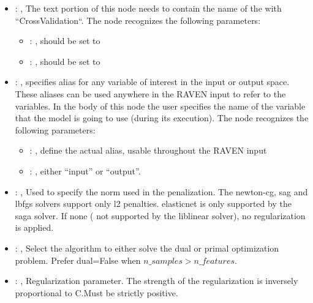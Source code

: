 \begin{itemize}
    \item {}: , 
      The text portion of this node needs to contain the name of the  with
               ``CrossValidation``.
      The  node recognizes the following parameters:
        \begin{itemize}
          \item {}: , 
            should be set to 
          \item {}: , 
            should be set to 
      \end{itemize}

    \item {}: , 
      specifies alias for         any variable of interest in the input or output space. These
      aliases can be used anywhere in the RAVEN input to         refer to the variables. In the body
      of this node the user specifies the name of the variable that the model is going to use
      (during its execution).
      The  node recognizes the following parameters:
        \begin{itemize}
          \item {}: , 
            define the actual alias, usable throughout the RAVEN input
          \item {}: , 
            either ``input'' or ``output''.
      \end{itemize}

    \item {}: , 
      Used to specify the norm used in the penalization. The newton-cg, sag and lbfgs solvers
      support only l2 penalties. elasticnet is only supported by the saga solver. If none (
      not supported by the liblinear solver), no regularization is applied.

    \item {}: , 
      Select the algorithm to either solve the dual or primal optimization problem.
      Prefer dual=False when $n\_samples > n\_features$.

    \item {}: , 
      Regularization parameter. The strength of the regularization is inversely
      proportional to C.Must be strictly positive.


\end{itemize}
